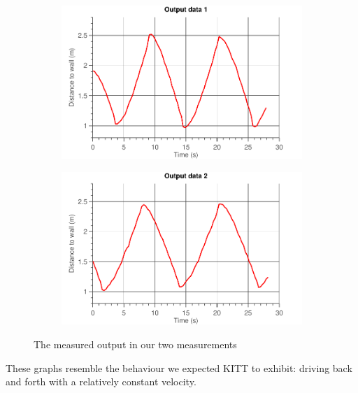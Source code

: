 \documentclass[11pt,titlepage]{report}
\begin{document}
\begin{figure}[H]
	\begin{subfigure}{.5\textwidth}
		\begin{center}
			\includegraphics[width=\linewidth]{resource/distances1.pdf}
		\end{center}
	\end{subfigure}
	\begin{subfigure}{.5\textwidth}
		\begin{center}
			\includegraphics[width=\linewidth]{resource/distances2.pdf}
		\end{center}
	\end{subfigure}
	\caption{The measured output in our two measurements}
	\label{fig:ass1-output}
\end{figure}

These graphs resemble the behaviour we expected KITT to exhibit: driving back and forth with a relatively constant velocity.
\end{document}
